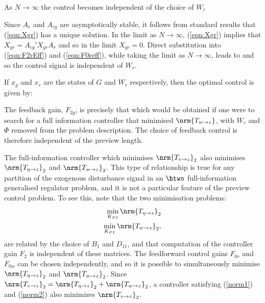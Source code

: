 \begin{cor}
As $N\rightarrow \infty$ the control becomes independent of the choice of $W_r$
\end{cor}
\begin{pf}
Since $A_r$ and $A_{cg}$ are asymptotically stable, it follows from standard results that (\ref{eqn:Xgr}) has a unique solution. In the limit as $N\rightarrow\infty$, (\ref{eqn:Xgr}) implies that $X_{gr}=A_{cg}'X_{gr}A_r$ and so in the limit $X_{gr}=0$. Direct substitution into (\ref{eqn:F2rEff}) and (\ref{eqn:F0reff}), while taking the limit as $N\rightarrow \infty$, leads to
and so the control signal is independent of $W_r$.
\end{pf}

\begin{rem}
\label{rem:PrevGainInterp}
If $x_g$ and $x_r$ are the states of $G$ and $W_r$ respectively, then the optimal control is given by:
\end{rem}

\begin{rem}
\label{rem:SmallPrevGain}
The feedback gain, $F_{2g}$, is precisely that which would be obtained if one were to search for a full information controller that minimised $\nrm{T_{w\rightarrow z}}$, with $W_r$ and $\Phi$ removed from the problem description. The choice of feedback control is therefore independent of the preview length.
\end{rem}

\begin{rem}
\label{rem:FIminwandr}
The full-information controller which minimises $\nrm{T_{v\rightarrow z}}_2$ also minimises $\nrm{T_{\eta\rightarrow z}}_2$ and $\nrm{T_{w\rightarrow z}}_2$. This type of relationship is true for any partition of the exogenous disturbance signal in an $\htwo$ full-information generalised regulator problem, and it is not a particular feature of the preview control problem. To see this, note that the two minimisation problems:
\begin{eqnarray}
\min_{K_{FI}}\nrm{T_{\eta\rightarrow z}}_2 \label{norm1} \\
\min_{K_{FI}}\nrm{T_{w\rightarrow z}}_2, \label{norm2}
\end{eqnarray}
are related by the choice of $B_1$ and $D_{11}$, and that computation of the controller gain $F_{2}$ is independent of these matrices. The feedforward control gains $F_{0r}$ and $F_{0w}$ can be chosen independently, and so it is possible to simultaneously minimise $\nrm{T_{\eta\rightarrow z}}_2$ and $\nrm{T_{w\rightarrow z}}_2$. Since $\nrm{T_{v \rightarrow z}}_2 = \nrm{T_{\eta\rightarrow z}}_2 + \nrm{T_{w \rightarrow z}}_2$, a controller satisfying (\ref{norm1}) and (\ref{norm2}) also minimizes $\nrm{T_{v \rightarrow z}}_2$.
\end{rem}

